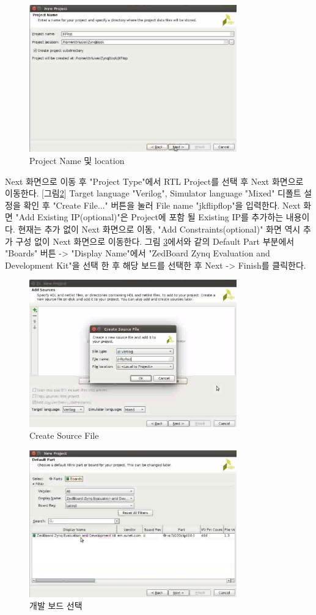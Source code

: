 \documentclass[11pt
  , a4paper
  , article
  , oneside
]{memoir}
\begin{document}
\begin{figure}[h!]
	\centering
	\includegraphics[width=0.8\textwidth, height=0.4\textwidth]{./images/vivado-pro-2.eps}
	\caption{Project Name 및 location}
	\label{fig:vivado_2} 
\end{figure}

Next 화면으로 이동 후 "Project Type"에서 RTL Project를 선택 후 Next 화면으로 이동한다. [그림\ref{fig:vivado_3}]
Target language "Verilog", Simulator language "Mixed" 디폴트 설정을 확인 후 "Create File..." 버튼을 눌러 File name "jkflipflop"을 입력한다. Next 화면 "Add Existing IP(optional)"은 Project에 포함 될 Existing IP를 추가하는 내용이다. 현재는 추가 없이 Next 화면으로 이동, "Add Constraints(optional)" 화면 역시 추가 구성 없이 Next 화면으로 이동한다. 그림 \ref{fig:vivado_4}에서와 같의 Default Part 부분에서 "Boards" 버튼 -> "Display Name"에서 "ZedBoard Zynq Evaluation and Development Kit"을 선택 한 후 해당 보드를 선택한 후 Next -> Finish를 클릭한다.

\hfil\break

\begin{figure}[h!]
	\centering
	\includegraphics[width=0.8\textwidth, height=0.4\textwidth]{./images/vivado-pro-3.eps}
	\caption{Create Source File}
	\label{fig:vivado_3} 
\end{figure}	

\begin{figure}[h!]
	\centering
	\includegraphics[width=0.8\textwidth, height=0.4\textwidth]{./images/vivado-pro-4.eps}
	\caption{개발 보드 선택}
	\label{fig:vivado_4} 
\end{figure}	
\end{document}
